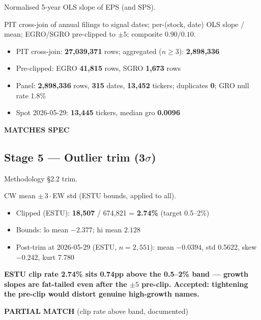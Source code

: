\documentclass[11pt,a4paper]{article}
\newcommand{\PASS}[1]{\textcolor{pass}{\textbf{#1}}}
\newcommand{\WARN}[1]{\textcolor{warn}{\textbf{#1}}}
\begin{document}
\begin{description}[style=nextline]
  \item[PDF SPEC] Normalised 5-year OLS slope of EPS (and SPS).
  \item[Implementation] PIT cross-join of annual filings to signal dates; per-(stock, date) OLS slope / mean; EGRO/SGRO pre-clipped to $\pm5$; composite $0.90/0.10$.
  \item[Observed]\phantom{x}
    \begin{itemize}[nosep, topsep=-\parskip]
      \item PIT cross-join: \textbf{27{,}039{,}371} rows; aggregated ($n\geq3$): \textbf{2{,}898{,}336}
      \item Pre-clipped: EGRO \textbf{41{,}815} rows, SGRO \textbf{1{,}673} rows
      \item Panel: \textbf{2{,}898{,}336} rows, \textbf{315} dates, \textbf{13{,}452} tickers; duplicates \textbf{0}; GRO null rate 1.8\%
      \item Spot 2026-05-29: \textbf{13{,}445} tickers, median gro \textbf{0.0096}
    \end{itemize}
  \item[Status] \PASS{MATCHES SPEC}
\end{description}

\subsection{Stage 5 --- Outlier trim (3$\sigma$)}

\begin{description}[style=nextline]
  \item[PDF SPEC] Methodology \S2.2 trim.
  \item[Implementation] CW mean $\pm\,3\cdot$EW std (ESTU bounds, applied to all).
  \item[Observed]\phantom{x}
    \begin{itemize}[nosep, topsep=-\parskip]
      \item Clipped (ESTU): \textbf{18{,}507} / 674{,}821 = \textbf{2.74\%} (target 0.5--2\%)
      \item Bounds: lo mean $-2.377$; hi mean $2.128$
      \item Post-trim at 2026-05-29 (ESTU, $n=2{,}551$): mean $-0.0394$, std 0.5622, skew $-0.242$, kurt 7.780
    \end{itemize}
  \item[Deviation] \WARN{ESTU clip rate 2.74\% sits 0.74pp above the 0.5--2\% band --- growth slopes are fat-tailed even after the $\pm5$ pre-clip. Accepted: tightening the pre-clip would distort genuine high-growth names.}
  \item[Status] \WARN{PARTIAL MATCH} (clip rate above band, documented)
\end{description}
\end{document}
